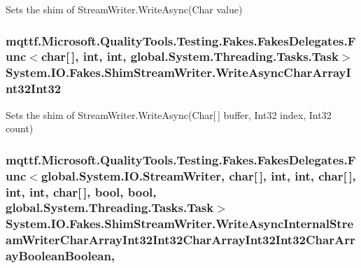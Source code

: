 Sets the shim of Stream\-Writer.\-Write\-Async(\-Char value)

\hypertarget{class_system_1_1_i_o_1_1_fakes_1_1_shim_stream_writer_a9ae24c314724461e107bab2957a82b1a}{
\subsubsection[{Write\-Async\-Char\-Array\-Int32\-Int32}]{\setlength{\rightskip}{0pt plus 5cm}mqttf.\-Microsoft.\-Quality\-Tools.\-Testing.\-Fakes.\-Fakes\-Delegates.\-Func$<$char\mbox{[}$\,$\mbox{]}, int, int, global.\-System.\-Threading.\-Tasks.\-Task$>$ System.\-I\-O.\-Fakes.\-Shim\-Stream\-Writer.\-Write\-Async\-Char\-Array\-Int32\-Int32\hspace{0.3cm}{\ttfamily [set]}}}\label{class_system_1_1_i_o_1_1_fakes_1_1_shim_stream_writer_a9ae24c314724461e107bab2957a82b1a}


Sets the shim of Stream\-Writer.\-Write\-Async(\-Char\mbox{[}$\,$\mbox{]} buffer, Int32 index, Int32 count)

\hypertarget{class_system_1_1_i_o_1_1_fakes_1_1_shim_stream_writer_afcaf231b71837dd1b3a74fe2acf479e9}{
\subsubsection[{Write\-Async\-Internal\-Stream\-Writer\-Char\-Array\-Int32\-Int32\-Char\-Array\-Int32\-Int32\-Char\-Array\-Boolean\-Boolean}]{\setlength{\rightskip}{0pt plus 5cm}mqttf.\-Microsoft.\-Quality\-Tools.\-Testing.\-Fakes.\-Fakes\-Delegates.\-Func$<$global.\-System.\-I\-O.\-Stream\-Writer, char\mbox{[}$\,$\mbox{]}, int, int, char\mbox{[}$\,$\mbox{]}, int, int, char\mbox{[}$\,$\mbox{]}, bool, bool, global.\-System.\-Threading.\-Tasks.\-Task$>$ System.\-I\-O.\-Fakes.\-Shim\-Stream\-Writer.\-Write\-Async\-Internal\-Stream\-Writer\-Char\-Array\-Int32\-Int32\-Char\-Array\-Int32\-Int32\-Char\-Array\-Boolean\-Boolean\hspace{0.3cm}{\ttfamily [static]}, {\ttfamily [set]}}}\label{class_system_1_1_i_o_1_1_fakes_1_1_shim_stream_writer_afcaf231b71837dd1b3a74fe2acf479e9}


